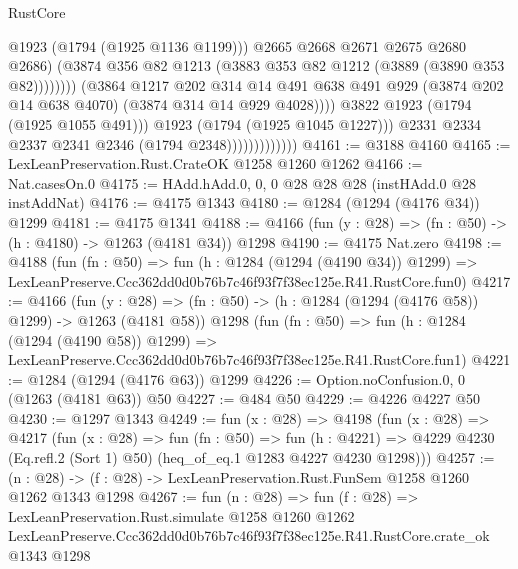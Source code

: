 \begin{lexlean}{RustCore}
\begin{coremodule}
                                                @1923
                                                (@1794 (@1925 @1136 @1199)))
                                              @2665
                                              @2668
                                              @2671
                                              @2675
                                              @2680
                                              @2686)
                                            (@3874
                                              @356
                                              @82
                                              @1213
                                              (@3883 @353 @82 @1212 (@3889 (@3890 @353 @82))))))))
                                    (@3864
                                      @1217
                                      @202
                                      @314
                                      @14
                                      @491
                                      @638
                                      @491
                                      @929
                                      (@3874 @202 @14 @638 @4070)
                                      (@3874 @314 @14 @929 @4028))))
                                @3822
                                @1923
                                (@1794 (@1925 @1055 @491)))
                              @1923
                              (@1794 (@1925 @1045 @1227)))
                            @2331
                            @2334
                            @2337
                            @2341
                            @2346
                            (@1794 @2348)))))))))))))
@4161 := @3188 @4160
@4165 := LexLeanPreservation.Rust.CrateOK @1258 @1260 @1262
@4166 := Nat.casesOn.{0}
@4175 := HAdd.hAdd.{0, 0, 0} @28 @28 @28 (instHAdd.{0} @28 instAddNat)
@4176 := @4175 @1343
@4180 := @1284 (@1294 (@4176 @34)) @1299
@4181 := @4175 @1341
@4188 := @4166 (fun (y : @28) => (fn : @50) -> (h : @4180) -> @1263 (@4181 @34)) @1298
@4190 := @4175 Nat.zero
@4198 := @4188
    (fun (fn : @50) =>
    fun (h : @1284 (@1294 (@4190 @34)) @1299) =>
    LexLeanPreserve.Ccc362dd0d0b76b7c46f93f7f38ec125e.R41.RustCore.fun0)
@4217 := @4166
    (fun (y : @28) => (fn : @50) -> (h : @1284 (@1294 (@4176 @58)) @1299) -> @1263 (@4181 @58))
    @1298
    (fun (fn : @50) =>
    fun (h : @1284 (@1294 (@4190 @58)) @1299) =>
    LexLeanPreserve.Ccc362dd0d0b76b7c46f93f7f38ec125e.R41.RustCore.fun1)
@4221 := @1284 (@1294 (@4176 @63)) @1299
@4226 := Option.noConfusion.{0, 0} (@1263 (@4181 @63)) @50
@4227 := @484 @50
@4229 := @4226 @4227 @50
@4230 := @1297 @1343
@4249 := fun (x : @28) =>
  @4198
    (fun (x : @28) =>
    @4217
      (fun (x : @28) =>
      fun (fn : @50) =>
      fun (h : @4221) =>
      @4229 @4230 (Eq.refl.{2} (Sort 1) @50) (heq_of_eq.{1} @1283 @4227 @4230 @1298)))
@4257 := (n : @28) -> (f : @28) -> LexLeanPreservation.Rust.FunSem @1258 @1260 @1262 @1343 @1298
@4267 := fun (n : @28) =>
  fun (f : @28) =>
  LexLeanPreservation.Rust.simulate
    @1258
    @1260
    @1262
    LexLeanPreserve.Ccc362dd0d0b76b7c46f93f7f38ec125e.R41.RustCore.crate_ok
    @1343
    @1298
\end{coremodule}
\end{lexlean}
